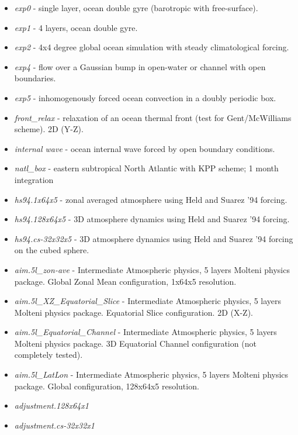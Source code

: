 \begin{itemize}
\item \textit{exp0} - single layer, ocean double gyre (barotropic with
free-surface).

\item \textit{exp1} - 4 layers, ocean double gyre.

\item \textit{exp2} - 4x4 degree global ocean simulation with steady
climatological forcing.

\item \textit{exp4} - flow over a Gaussian bump in open-water or channel
with open boundaries.

\item \textit{exp5} - inhomogenously forced ocean convection in a doubly
periodic box.

\item \textit{front\_relax} - relaxation of an ocean thermal front (test for
Gent/McWilliams scheme). 2D (Y-Z).

\item \textit{internal wave} - ocean internal wave forced by open boundary
conditions.

\item \textit{natl\_box} - eastern subtropical North Atlantic with KPP
scheme; 1 month integration

\item \textit{hs94.1x64x5} - zonal averaged atmosphere using Held and Suarez
'94 forcing.

\item \textit{hs94.128x64x5} - 3D atmosphere dynamics using Held and Suarez
'94 forcing.

\item \textit{hs94.cs-32x32x5} - 3D atmosphere dynamics using Held and
Suarez '94 forcing on the cubed sphere.

\item \textit{aim.5l\_zon-ave} - Intermediate Atmospheric physics, 5 layers
Molteni physics package. Global Zonal Mean configuration, 1x64x5 resolution.

\item \textit{aim.5l\_XZ\_Equatorial\_Slice} - Intermediate Atmospheric
physics, 5 layers Molteni physics package. Equatorial Slice configuration.
2D (X-Z).

\item \textit{aim.5l\_Equatorial\_Channel} - Intermediate Atmospheric
physics, 5 layers Molteni physics package. 3D Equatorial Channel
configuration (not completely tested).

\item \textit{aim.5l\_LatLon} - Intermediate Atmospheric physics, 5 layers
Molteni physics package. Global configuration, 128x64x5 resolution.

\item \textit{adjustment.128x64x1}

\item \textit{adjustment.cs-32x32x1}
\end{itemize}

